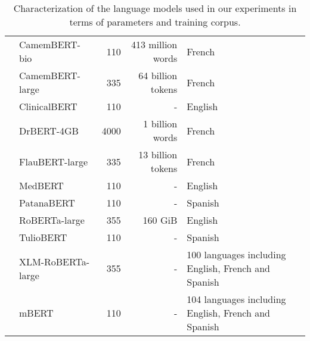 \begin{table}[ht]
{\begin{tabular}{clrrl}
 & CamemBERT-bio \cite{touchent2023camembertbio} & 110 & 413 million words & French \\
 & CamemBERT-large \cite{martin2019camembert} & 335 & 64 billion tokens & French \\
 & ClinicalBERT \cite{wang2023optimized} & 110 & - & English \\
 & DrBERT-4GB \cite{labrak2023drbert} & 4000 & 1 billion words & French \\
 & FlauBERT-large \cite{le2019flaubert} & 335 & 13 billion tokens & French \\
 & MedBERT \cite{charangan2022medbert} & 110 & - & English \\
 & PatanaBERT & 110 & - & Spanish \\
 & RoBERTa-large \cite{liu2019roberta} & 355 & 160 GiB & English \\
 & TulioBERT & 110 & - & Spanish \\
 & XLM-RoBERTa-large \cite{conneau2020unsupervised} & 355 & - & 100 languages including English, French and Spanish \\
 & mBERT \cite{devlin2019bert} & 110 & - & 104 languages including English, French and Spanish \\
\bottomrule
\end{tabular}}
\caption{Characterization of the language models used in our experiments in terms of parameters and training corpus.}
\label{tab:LM_features}
\end{table}
